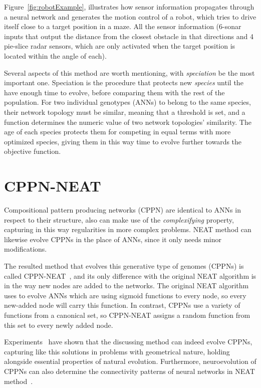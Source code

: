 Figure~\ref{fig:robotExample}, illustrates how sensor information propagates through a neural network and generates the motion control of a robot, which tries to drive itself close to a target position in a maze. All the sensor information (6-sonar inputs that output the distance from the closest obstacle in that directions and 4 pie-slice radar sensors, which are only activated when the target position is located within the angle of each).

Several aspects of this method are worth mentioning, with \emph{speciation} be the most important one. Speciation is the procedure that protects new \emph{species} until the have enough time to evolve, before comparing them with the rest of the population. For two individual genotypes (ANNs) to belong to the same species, their network topology must be similar, meaning that a threshold is set, and a function determines the numeric value of two network topologies' similarity. The age of each species protects them for competing in equal terms with more optimized species, giving them in this way time to evolve further towards the objective function.



\section{CPPN-NEAT}

Compositional pattern producing networks (CPPN) are identical to ANNs in respect to their structure, also can make use of the \emph{complexifying} property, capturing in this way regularities in more complex problems. NEAT method can likewise evolve CPPNs in the place of ANNs, since it only needs minor modifications.

The resulted method that evolves this generative type of genomes (CPPNs) is called CPPN-NEAT~\cite{stanley2007compositional}, and its only difference with the original NEAT algorithm is in the way new nodes are added to the networks. The original NEAT algorithm uses to evolve ANNs which are using sigmoid functions to every node, so 
every new-added node will carry this function.
In contrast, CPPNs use a variety of functions from a canonical set, so CPPN-NEAT assigns a random function from this set to every newly added node.

Experiments~\cite{stanley2007compositional} have shown that the discussing method can indeed evolve CPPNs, capturing like this solutions in problems with geometrical nature, holding alongside essential properties of natural evolution. Furthermore, neuroevolution of CPPNs can also determine the connectivity patterns of neural networks in NEAT method~\cite{stanley2009hypercube}.




